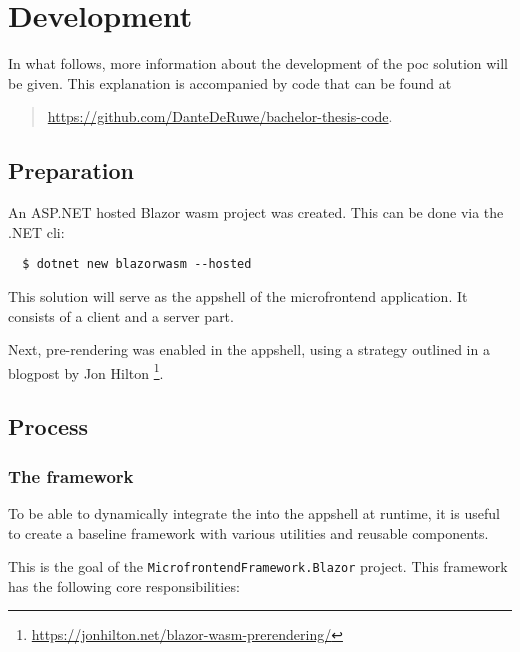 \section{Development}
\label{sec:poc-development}

In what follows, more information about the development of the \gls{poc}
solution will be given. This explanation is accompanied by code that can be
found at
\begin{quote}
   \url{https://github.com/DanteDeRuwe/bachelor-thesis-code}.
\end{quote}

\subsection{Preparation}

An ASP.NET hosted Blazor \gls{wasm} project was created. This can be done via
the .NET \gls{cli}:

\begin{verbatim}
  $ dotnet new blazorwasm --hosted
\end{verbatim}

This solution will serve as the \gls{appshell} of the \gls{microfrontend}
application. It consists of a client and a server part.

Next, pre-rendering was enabled in the \gls{appshell}, using a strategy outlined
in a blogpost by Jon Hilton
\footnote{\url{https://jonhilton.net/blazor-wasm-prerendering/}}.

\subsection{Process}

\subsubsection{The framework}

To be able to dynamically integrate the  into the
\gls{appshell} at runtime, it is useful to create a baseline framework with
various utilities and reusable components.

This is the goal of the
\texttt{MicrofrontendFramework.Blazor}
project. This framework has the following core responsibilities:

